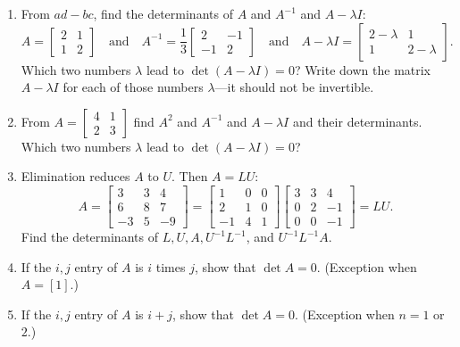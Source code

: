\documentclass[14pt, a4paper]{article}
\begin{document}
\begin{enumerate}[resume]
    \item From $ad - bc$, find the determinants of $A$ and $A^{-1}$ and $A - \lambda I$:
          \[
              A = \begin{bmatrix} 2 & 1 \\ 1 & 2 \end{bmatrix} \quad \text{and} \quad
              A^{-1} = \frac{1}{3} \begin{bmatrix} 2 & -1 \\ -1 & 2 \end{bmatrix} \quad \text{and} \quad
              A - \lambda I = \begin{bmatrix} 2 - \lambda & 1 \\ 1 & 2 - \lambda \end{bmatrix}.
          \]
          Which two numbers $\lambda$ lead to $\det(A - \lambda I) = 0$? Write down the matrix $A - \lambda I$ for each of those numbers $\lambda$---it should not be invertible.

    \item From $A = \begin{bmatrix} 4 & 1 \\ 2 & 3 \end{bmatrix}$ find $A^2$ and $A^{-1}$ and $A - \lambda I$ and their determinants. Which two numbers $\lambda$ lead to $\det(A - \lambda I) = 0$?

    \item Elimination reduces $A$ to $U$. Then $A = LU$:
          \[
              A = \begin{bmatrix} 3 & 3 & 4 \\ 6 & 8 & 7 \\ -3 & 5 & -9 \end{bmatrix}
              = \begin{bmatrix} 1 & 0 & 0 \\ 2 & 1 & 0 \\ -1 & 4 & 1 \end{bmatrix}
              \begin{bmatrix} 3 & 3 & 4 \\ 0 & 2 & -1 \\ 0 & 0 & -1 \end{bmatrix} = LU.
          \]
          Find the determinants of $L, U, A, U^{-1}L^{-1}$, and $U^{-1}L^{-1}A$.

    \item If the $i,j$ entry of $A$ is $i$ times $j$, show that $\det A = 0$. (Exception when $A = [1]$.)

    \item If the $i,j$ entry of $A$ is $i + j$, show that $\det A = 0$. (Exception when $n = 1$ or $2$.)


\end{enumerate}
\end{document}
